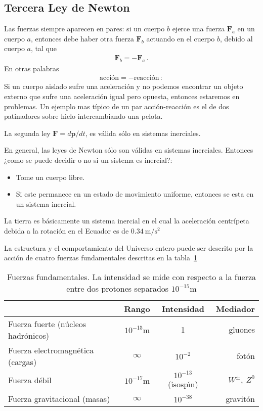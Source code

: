 \subsection{Tercera Ley de Newton}
Las fuerzas siempre aparecen en pares: si un cuerpo $b$ ejerce una fuerza $\mathbf{F}_a$ en un cuerpo $a$, entonces debe haber otra fuerza $\mathbf{F}_b$ actuando en el cuerpo $b$, debido al cuerpo $a$, tal que
\begin{align}
  \mathbf{F}_b=-\mathbf{F}_a\,.
\end{align}
En otras palabras
\begin{align}
  \text{acci\'on}=-\text{reacci\'on}\,:
\end{align}
Si un cuerpo aislado sufre una aceleraci\'on y no podemos encontrar un objeto externo que sufre una aceleraci\'on igual pero opuesta, entonces estaremos en problemas. Un ejemplo mas típico de un par acción-reacción es el de dos patinadores sobre hielo intercambiando una pelota.

La segunda ley $\mathbf{F}=d\mathbf{p}/dt$,  es válida sólo en sistemas inerciales.

En general, las leyes de Newton sólo son válidas en sistemas inerciales. Entonces ¿como se puede decidir o no si un sistema es inercial?:
\begin{itemize}
\item Tome un cuerpo libre.
\item Si este permanece en un estado de movimiento uniforme, entonces se esta en un sistema inercial.
\end{itemize}

La tierra es b\'asicamente un sistema inercial en el cual la aceleración centrípeta debida a la rotación en el Ecuador es de $\SI{0.34}{\meter\per\second\squared}$

La estructura y el comportamiento del Universo entero puede ser descrito por la acción de cuatro fuerzas fundamentales descritas en la tabla~\ref{tab:forces}
\begin{table}
  \centering
  \begin{tabular}{l|cc|r}
    &Rango& Intensidad&Mediador\\\hline
Fuerza fuerte (n\'ucleos hadr\'onicos) & $10^{-15}\si{\meter}$ &1 &gluones\\
Fuerza electromagn\'etica (cargas) & $\infty$ & $10^{-2}$ & fot\'on\\
Fuerza d\'ebil &$10^{-17}\si{\meter}$&$10^{-13}$ (isosp\'\i n)& $W^\pm,\ Z^0$\\
Fuerza gravitacional (masas)&$\infty$& $10^{-38}$& gravit\'on\\
  \end{tabular}
  \caption{Fuerzas fundamentales. La intensidad se mide con respecto a la fuerza entre dos protones separados $10^{-15}\si{\meter}$}
  \label{tab:forces}
\end{table}



